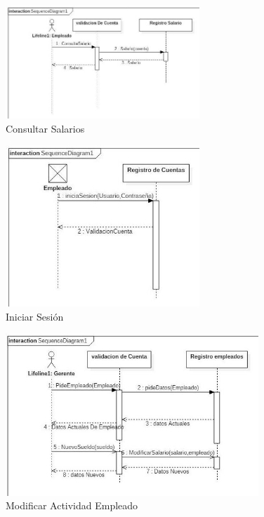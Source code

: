 \documentclass[12pt, fleqn]{report}                             %
\begin{document}
        \begin{figure}[ht]
            \centering
            \includegraphics[width=0.65\textwidth]{DiagramaSecuencial4}
            \caption{Consultar Salarios}
        \end{figure}


        \begin{figure}[ht]
            \centering
            \includegraphics[width=0.65\textwidth]{DiagramaSecuencial5}
            \caption{Iniciar Sesión}
        \end{figure}

        \begin{figure}[ht]
            \centering
            \includegraphics[width=0.85\textwidth]{DiagramaSecuencial6}
            \caption{Modificar Actividad Empleado}
        \end{figure}
\end{document}
